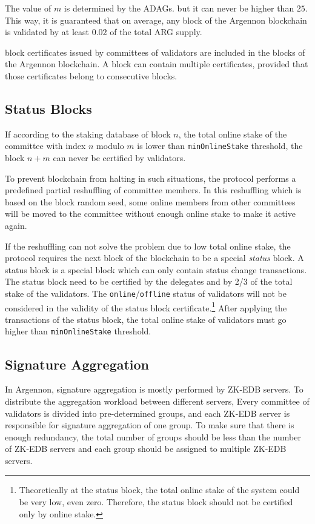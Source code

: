 The value of $m$ is determined by the ADAGs. but it can never be higher than $25$. This way, it is guaranteed
that on average, any block of the Argennon blockchain is validated by at least $0.02$ of the total ARG supply.

block certificates issued by committees of validators are included in the blocks of the Argennon blockchain.
A block can contain multiple certificates, provided that
those certificates belong to consecutive blocks.

\subsection{Status Blocks}\label{subsec:status-blocks}

If according to the staking database of block $n$, the total online stake of the committee with index $n$ modulo $m$ is
lower than \texttt{minOnlineStake} threshold, the block $n + m$ can never be certified by validators.

To prevent blockchain from halting in such situations, the protocol performs a predefined partial
reshuffling of committee members.
In this reshuffling which is based on the block random seed, some online members from other committees will
be moved to the committee without enough online stake to make it active again.

If the reshuffling can not solve the problem due to low total online stake, the protocol requires the next block
of the blockchain to be a special \emph{status} block. A status block is a special block which can only contain
status change transactions. The status block need to be certified by the delegates and by 2/3 of the total stake of
the validators. The \texttt{online}/\texttt{offline} status of validators will not be considered in the validity of
the status block certificate.\footnote{Theoretically at the status block, the total online stake of the system could
be very low, even zero. Therefore, the status block should not be certified only by online stake.} After applying
the transactions of the status block, the total online stake of validators
must go higher than \texttt{minOnlineStake} threshold.

\subsection{Signature Aggregation}\label{subsec:sig-agg}

In Argennon, signature aggregation is mostly performed by ZK-EDB servers. To distribute the aggregation workload
between different servers, Every committee of validators is divided into pre-determined groups, and each ZK-EDB
server is responsible for signature aggregation of one group. To make sure that there is enough redundancy, the
total number of groups should be less than the number of ZK-EDB servers and each group should be assigned to
multiple ZK-EDB servers.

